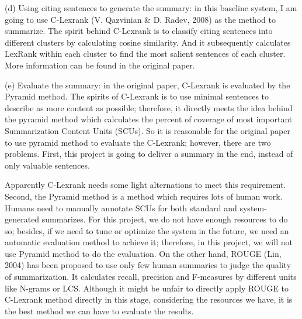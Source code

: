 \documentclass[hyp]{socreport}
\begin{document}
(d) Using citing sentences to generate the summary: in this baseline system, I am going to use C-Lexrank (V. Qazvinian \& D. Radev, 2008) as the 
method to summarize. The spirit behind C-Lexrank is to classify citing sentences into different clusters by calculating cosine similarity. And it 
subsequently calculates LexRank within each cluster to find the most salient sentences of each cluster. More information can be found in the original paper. 

(e) Evaluate the summary: in the original paper, C-Lexrank is evaluated by the Pyramid method. The spirits of C-Lexrank is to use minimal 
sentences to describe as more content as possible; therefore, it directly meets the idea behind the pyramid method which calculates the 
percent of coverage of most important Summarization Content Units (SCUs). So it is reasonable for the original paper to use pyramid method 
to evaluate the C-Lexrank; however, there are two problems. First, this project is going to deliver a summary in the end, instead of only
valuable sentences. 

Apparently C-Lexrank needs some light alternations to meet this requirement. Second, the Pyramid method is a method which 
requires lots of human work. Humans need to manually annotate SCUs for both standard and system-generated summarizes. For this project, we do not 
have enough resources to do so; besides, if we need to tune or optimize the system in the future, we need an automatic evaluation method to 
achieve it; therefore, in this project, we will not use Pyramid method to do the evaluation. On the other hand, ROUGE (Lin, 2004) has been 
proposed to use only few human summaries to judge the quality of summarization. It calculates recall, precision and F-measures by different 
units like N-grams or LCS. Although it might be unfair to directly apply ROUGE to C-Lexrank method directly in this stage, considering the 
resources we have, it is the best method we can have to evaluate the results.
\end{document}
